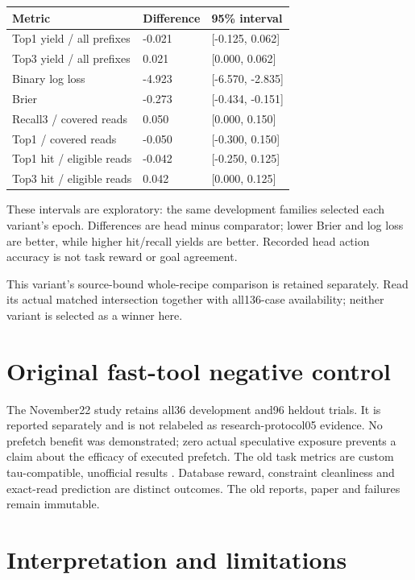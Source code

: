 \documentclass[10pt]{article}
\begin{document}
\begin{longtable}[]{@{}lll@{}}
\toprule\noalign{}
Metric & Difference & 95\% interval \\
\midrule\noalign{}
\endhead
\bottomrule\noalign{}
\endlastfoot
Top1 yield / all prefixes & -0.021 & {[}-0.125, 0.062{]} \\
Top3 yield / all prefixes & 0.021 & {[}0.000, 0.062{]} \\
Binary log loss & -4.923 & {[}-6.570, -2.835{]} \\
Brier & -0.273 & {[}-0.434, -0.151{]} \\
Recall3 / covered reads & 0.050 & {[}0.000, 0.150{]} \\
Top1 / covered reads & -0.050 & {[}-0.300, 0.150{]} \\
Top1 hit / eligible reads & -0.042 & {[}-0.250, 0.125{]} \\
Top3 hit / eligible reads & 0.042 & {[}0.000, 0.125{]} \\
\end{longtable}

These intervals are exploratory: the same development families selected each variant's epoch. Differences are head minus comparator; lower Brier and log loss are better, while higher hit/recall yields are better. Recorded head action accuracy is not task reward or goal agreement.

This variant's source-bound whole-recipe comparison is retained separately. Read its actual matched intersection together with all136-case availability; neither variant is selected as a winner here.

\hypertarget{original-fast-tool-negative-control}{%
\section{Original fast-tool negative control}\label{original-fast-tool-negative-control}}

The November22 study retains all36 development and96 heldout trials. It is reported separately and is not relabeled as research-protocol05 evidence. No prefetch benefit was demonstrated; zero actual speculative exposure prevents a claim about the efficacy of executed prefetch. The old task metrics are custom tau-compatible, unofficial results \citep{tau2paper, tau2pinned}. Database reward, constraint cleanliness and exact-read prediction are distinct outcomes. The old reports, paper and failures remain immutable.

\hypertarget{interpretation-and-limitations}{%
\section{Interpretation and limitations}\label{interpretation-and-limitations}}
\end{document}
